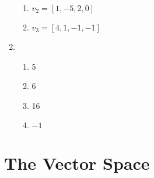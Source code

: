 \documentclass{article}
\begin{document}
\begin{enumerate}
\begin{enumerate}
                \item $v_2 = [1,-5,2,0]$
                \item $v_3 = [4,1,-1,-1]$
            \end{enumerate}
        \item 
            \begin{enumerate}
                \item 5
                \item 6
                \item 16
                \item $-1$
            \end{enumerate}
    \end{enumerate}
    \section{The Vector Space}
\end{document}
